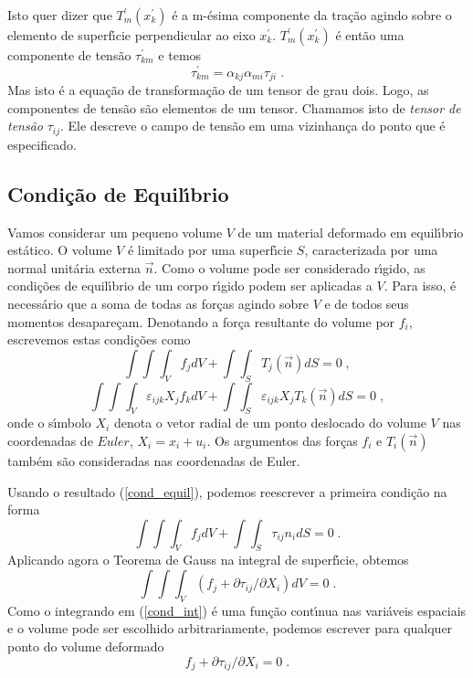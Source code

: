 Isto quer dizer que $T^{'}_m(x^{'}_k)$ \'e a m-\'esima componente
da tra\c{c}\~ao agindo sobre o elemento de superf\'{\i}cie
perpendicular ao eixo $x^{'}_k$. $T^{'}_m(x^{'}_k)$ \'e ent\~ao
uma componente de tens\~ao $\tau^{'}_{km}$ e temos
\begin{equation}
\tau^{'}_{km} = \alpha_{kj} \alpha_{mi} \tau_{ji} \;.
\end{equation}
Mas isto \'e a equa\c{c}\~ao de transforma\c{c}\~ao de um tensor
de grau dois. Logo, as componentes de tens\~ao s\~ao elementos de
um tensor. Chamamos isto de {\it tensor de tens\~ao} $\tau_{ij}$.
Ele descreve o campo de tens\~ao em uma vizinhan\c{c}a do ponto
que \'e especificado.





\subsection{Condi\c{c}\~ao de Equil\'{\i}brio}

Vamos considerar um pequeno volume $V$ de um material deformado em
equil\'{\i}brio est\'atico. O volume $V$ \'e limitado por uma
superf\'{\i}cie $S$, caracterizada por uma normal unit\'aria
externa $\vec{n}$. Como o volume pode ser considerado r\'{\i}gido,
as condi\c{c}\~oes de equil\'{\i}brio de um corpo r\'{\i}gido
podem ser aplicadas a $V$. Para isso, \'e necess\'ario que a soma
de todas as for\c{c}as agindo sobre $V$ e de todos seus momentos
desapare\c{c}am. Denotando a for\c{c}a resultante do volume por
$f_i$, escrevemos estas condi\c{c}\~oes como
$$ \int \!\! \int \!\!  \int_V f_j dV + \int \!\! \int_S T_j
(\vec{n}) dS = 0 \;,$$
$$ \int \!\! \int \!\!  \int_V \varepsilon_{ijk} X_j f_k dV + \int \!\! \int_S
\varepsilon_{ijk} X_j T_k (\vec{n}) dS = 0 \;,$$ onde o
s\'{\i}mbolo $X_i$ denota o vetor radial de um ponto deslocado do
volume $V$ nas coordenadas de $Euler$, $X_i = x_i+u_i$. Os
argumentos das for\c{c}as $f_i$ e $T_i (\vec{n})$ tamb\'em s\~ao
consideradas nas coordenadas de Euler.

Usando o resultado (\ref{cond_equil}), podemos reescrever a
primeira condi\c{c}\~ao na forma
\begin{equation} \int \!\! \int
\!\! \int_V f_j dV + \int \!\! \int_S \tau_{ij}n_i dS = 0 \;.
\end{equation}
Aplicando agora o Teorema de Gauss na integral de superf\'{\i}cie,
obtemos
\begin{equation}
\int \!\! \int \!\!  \int_V (f_j + \partial \tau_{ij}/\partial X_i
)dV= 0 \;. \label{cond_int}
\end{equation}
Como o integrando em (\ref{cond_int}) \'e uma fun\c{c}\~ao
cont\'{\i}nua nas vari\'aveis espaciais e o volume pode ser
escolhido arbitrariamente, podemos escrever para qualquer ponto do
volume deformado
\begin{equation}
f_j + \partial \tau_{ij}/\partial X_i = 0 \;.
\label{eq_equi_back}
\end{equation}

